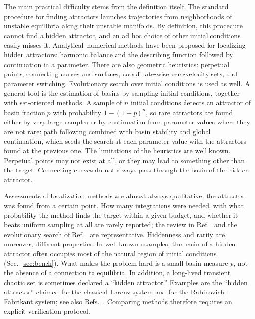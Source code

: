 The main practical difficulty stems from the definition itself. The standard procedure for finding attractors launches trajectories from neighborhoods of unstable equilibria along their unstable manifolds. By definition, this procedure cannot find a hidden attractor, and an ad hoc choice of other initial conditions easily misses it. Analytical--numerical methods have been proposed for localizing hidden attractors: harmonic balance and the describing function followed by continuation in a parameter.\cite{Leonov2011PLA,KuznetsovLeonovVagaitsev2010,Kuznetsov2017IFAC} There are also geometric heuristics: perpetual points,\cite{Prasad2015,Dudkowski2015PP,Dudkowski2017PP} connecting curves\cite{Gilmore2010CC,GuanXie2021CC,Naseri2021} and surfaces,\cite{Song2023CS} coordinate-wise zero-velocity sets,\cite{Godara2018CVS} and parameter switching.\cite{Danca2018Switching} Evolutionary search over initial conditions is used as well.\cite{Zelinka2016,Zelinka2021Chapter} A general tool is the estimation of basins by sampling initial conditions,\cite{Menck2013,DatserisWagemakers2022,Datseris2023Framework,StenderHoffmann2022,Gelbrecht2020MCBB} together with set-oriented methods.\cite{Hsu1987,DellnitzHohmann1997} A sample of $n$ initial conditions detects an attractor of basin fraction $p$ with probability $1-(1-p)^n$,\cite{Datseris2023Framework} so rare attractors are found either by very large samples or by continuation from parameter values where they are not rare: path following combined with basin stability\cite{Brzeski2017} and global continuation, which seeds the search at each parameter value with the attractors found at the previous one.\cite{Datseris2023Framework,Datseris2026Global,Haerter2026BBT} The limitations of the heuristics are well known. Perpetual points may not exist at all, or they may lead to something other than the target.\cite{Nazarimehr2017PP,Jafari2015LimitPP,Jafari2026NoPP} Connecting curves do not always pass through the basin of the hidden attractor.\cite{GuanXie2025}

Assessments of localization methods are almost always qualitative: the attractor was found from a certain point. How many integrations were needed, with what probability the method finds the target within a given budget, and whether it beats uniform sampling at all are rarely reported; the review in Ref.~ and the evolutionary search of Ref.~ are representative. Hiddenness and rarity are, moreover, different properties. In well-known examples, the basin of a hidden attractor often occupies most of the natural region of initial conditions (Sec.~\ref{sec:bench}). What makes the problem hard is a small basin measure $p$, not the absence of a connection to equilibria. In addition, a long-lived transient chaotic set is sometimes declared a ``hidden attractor.'' Examples are the ``hidden attractor'' claimed for the classical Lorenz system\cite{Munmuangsaen2018,SprottMunmuangsaen2018Comment} and for the Rabinovich--Fabrikant system;\cite{Danca2016Transient} see also Refs.~. Comparing methods therefore requires an explicit verification protocol.

